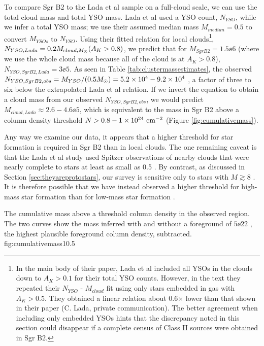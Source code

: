 \documentclass[twocolumn]{aastex61}
\begin{document}
To compare Sgr B2 to the Lada et al sample on a full-cloud scale, we can use
the total cloud mass and total YSO mass.  Lada et al used a YSO count, $N_{YSO}$,
while we infer a total YSO mass; we use their assumed median mass
$M_{median} = 0.5$ \msun to convert $M_{YSOs}$ to $N_{YSO}$.  Using their
fitted relation for local clouds\footnote{In the main body of their paper, Lada
et al included all YSOs in the clouds down to $A_K>0.1$ for their total YSO
counts.  However, in the text they repeated their $N_{YSO}$ - $M_{cloud}$ fit
using only stars embedded in gas with $A_K>0.5$.  They obtained a linear
relation about 0.6$\times$ lower than that shown in their paper (C. Lada,
private communication).  The better agreement when including only embedded
YSOs hints that the discrepancy noted in this section could disappear if a
complete census of Class II sources were obtained in Sgr B2.}, $N_{YSO,Lada} = 0.2
M_{cloud,M_{\odot}}(A_K>0.8)$, we
predict that for $M_{Sgr B2}=1.5\ee{6}$ \msun (where we use the whole cloud
mass because all of the cloud is at $A_K>0.8$), $N_{YSO,Sgr B2,Lada} =
3\ee{5}$.  As seen in Table \ref{tab:clustermassestimates}, the observed
$N_{YSO,Sgr B2,obs} = M_{YSO} /
(0.5 M_{\odot}) = 5.2\times10^{4}-9.2\times10^{4}$ \msun, a factor of three to six below the
extrapolated Lada et al relation.  If we invert the equation to obtain a cloud
mass from our
observed $N_{YSO,Sgr B2,obs}$, we would predict $M_{cloud,Lada}\approx2.6-4.6\ee{5}$,
which is equivalent to the mass in Sgr B2 above a column density threshold
$N>0.8-1\times10^{24}~\textrm{cm}^{-2}$ (Figure \ref{fig:cumulativemass}).

Any way we examine our data, it appears that a higher threshold for star
formation is required in Sgr B2 than in local clouds.  The one remaining caveat
is that the Lada et al study  used Spitzer observations of nearby clouds that
were nearly complete to stars at least as small as 0.5 \msun.  By contrast, as
discussed in Section \ref{sec:theyareprotostars}, our survey is sensitive only
to stars with $M\gtrsim8$ \msun.  It is therefore possible that we have instead
observed a higher threshold for high-mass star formation than for low-mass star
formation \citep[e.g., as suggested by ][]{Krumholz2008a}.


{The cumulative mass above a threshold column density in the observed
region.  The two curves show the mass inferred with and without a
foreground of $5\ee{22}$ \persc, the highest plausible foreground column
density, subtracted.}
{fig:cumulativemass}{1}{0.5\textwidth}
\end{document}

